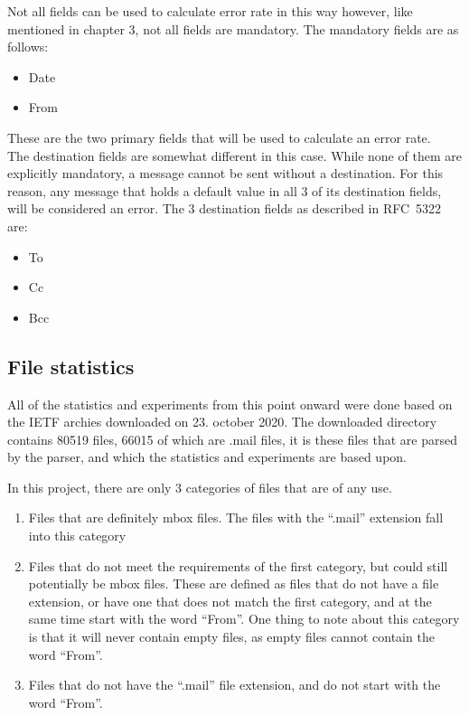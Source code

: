 \documentclass[a4paper,english]{report}
\begin{document}
Not all fields can be used to calculate error rate in this way however, like mentioned in chapter 3, not all fields are mandatory. The mandatory fields are as follows:

\begin{itemize}

\item Date
\item From 


\end{itemize}


These are the two primary fields that will be used to calculate an error rate.\\

The destination fields are somewhat different in this case. While none of them are explicitly mandatory, a message cannot be sent without a destination. For this reason, any message that holds a default value in all 3 of its destination fields, will be considered an error.
The 3 destination fields as described in RFC~5322 are:
\begin{itemize}
\item To
\item Cc
\item Bcc

\end{itemize}

\subsection{File statistics}
All of the statistics and experiments from this point onward were done based on the IETF archies downloaded on 23. october 2020.
The downloaded directory contains 80519 files, 66015 of which are .mail files, it is these files that are parsed by the parser, and which the statistics and experiments are based upon.

In this project, there are only 3 categories of files that are of any use.

\begin{enumerate}
\item Files that are definitely mbox files. The files with the “.mail” extension fall into this category 

\item Files that do not meet the requirements of the first category, but could still potentially be mbox files. These are defined as files that do not have a  file extension, or have one that does not match the first category, and at the same time start with the word “From”. One thing to note about this category is that it will never contain empty files, as empty files cannot contain the word “From”.

\item Files that do not have the “.mail” file extension, and do not start with the word “From”.

\end{enumerate}
\end{document}
